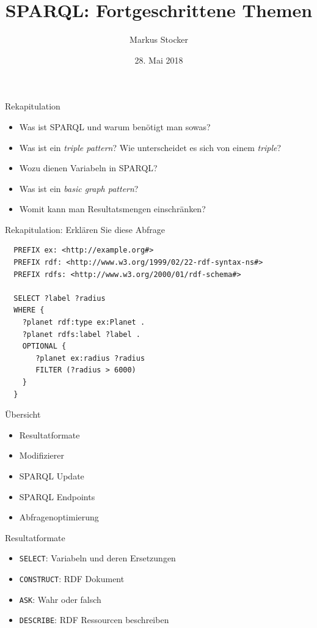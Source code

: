 \documentclass{beamer}
\title{SPARQL: Fortgeschrittene Themen}
\author{Markus Stocker}
\date{28. Mai 2018}
\begin{document}
\maketitle

\begin{frame}{Rekapitulation}
	
	\begin{itemize}
		\item Was ist SPARQL und warum benötigt man sowas?
		\item Was ist ein \emph{triple pattern}? Wie unterscheidet es sich von einem \emph{triple}?
		\item Wozu dienen Variabeln in SPARQL?
		\item Was ist ein \emph{basic graph pattern}?
		\item Womit kann man Resultatsmengen einschränken?
	\end{itemize}
	
\end{frame}

\begin{frame}[fragile]{Rekapitulation: Erklären Sie diese Abfrage}
	
	\small
	\begin{lstlisting}
  PREFIX ex: <http://example.org#> 
  PREFIX rdf: <http://www.w3.org/1999/02/22-rdf-syntax-ns#>
  PREFIX rdfs: <http://www.w3.org/2000/01/rdf-schema#>
	
  SELECT ?label ?radius
  WHERE {
    ?planet rdf:type ex:Planet .
    ?planet rdfs:label ?label .
    OPTIONAL { 
       ?planet ex:radius ?radius 
       FILTER (?radius > 6000)
    }
  }
	\end{lstlisting}
	
\end{frame}

\begin{frame}{Übersicht}
	
	\begin{itemize}
		\item Resultatformate
		\item Modifizierer
		\item SPARQL Update
		\item SPARQL Endpoints
		\item Abfragenoptimierung
	\end{itemize}
	
\end{frame}

\begin{frame}{Resultatformate}
	
	\begin{itemize}
		\item \texttt{SELECT}: Variabeln und deren Ersetzungen
		\item \texttt{CONSTRUCT}: RDF Dokument
		\item \texttt{ASK}: Wahr oder falsch
		\item \texttt{DESCRIBE}: RDF Ressourcen beschreiben
	\end{itemize}
	
\end{frame}
\end{document}
